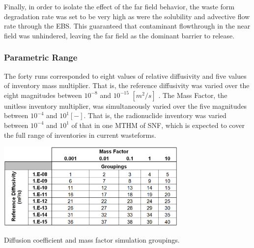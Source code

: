Finally, in order to isolate the effect of the far field behavior, the waste form 
degradation rate was set to be very high as were the solubility and advective 
flow rate through the  \gls{EBS}. This guaranteed that contaminant flowthrough 
in the near field was unhindered, leaving the far field as the dominant barrier 
to release.


\subsubsection{Parametric Range}
\label{sec:diffCoeffRange}

The forty runs corresponded to eight values of relative diffusivity and five 
values of inventory mass multiplier. That is, the reference diffusivity was varied over the 
eight magnitudes between $ 10^{-8}$ and $10^{-15}$ $[m^2 /s]$ . 
The Mass Factor, the unitless inventory multiplier, was simultaneously varied over 
the five magnitudes between $10^{-4}$ and $10^{1} [-]$. That is, the 
radionuclide inventory was varied between $10^{-4}$ and $10^{1}$ of that in one 
\gls{MTHM} of \gls{SNF}, which is expected to cover the full range of 
inventories in current wasteforms.

\begin{table}[hbp!]
\centering
\includegraphics[width=0.7\textwidth]{./chapters/nuclide_sensitivity/clay/DiffCoeffAndInvEBSFail/DiffCoeffAndInvGroups.eps}
\caption{Diffusion coefficient and mass factor simulation groupings.}
\label{tab:DiffCoeffAndInvGroups}
\end{table}


